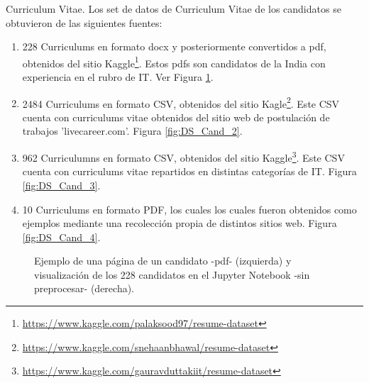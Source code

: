 \documentclass[12pt,a4paper]{article}
\makeatletter
\renewcommand\paragraph{\@startsection{paragraph}{4}{\z@}
            {-2.5ex\@plus -1ex \@minus -.25ex}
            {1.25ex \@plus .25ex}
            {\normalfont\normalsize\bfseries}}
\makeatother
\begin{document}
\begin{sloppypar}
\cleardoublepage

\paragraph{Curriculum Vitae.}\label{cvs}
Los set de datos de Curriculum Vitae de los candidatos se obtuvieron de las siguientes fuentes:

\begin{enumerate}
\item 228 Curriculums en formato docx y posteriormente convertidos a pdf, obtenidos del sitio Kaggle\footnote{\url{https://www.kaggle.com/palaksood97/resume-dataset}}. Estos pdfs son candidatos de la India con experiencia en el rubro de IT. Ver Figura \ref{fig:DS_Cand_1}.
\item 2484 Curriculums en formato CSV, obtenidos del sitio Kagle\footnote{\url{https://www.kaggle.com/snehaanbhawal/resume-dataset}}. Este CSV cuenta con curriculums vitae obtenidos del sitio web de postulación de trabajos 'livecareer.com'. Figura \ref{fig:DS_Cand_2}.
\item 962 Curriculumns en formato CSV, obtenidos del sitio Kaggle\footnote{\url{https://www.kaggle.com/gauravduttakiit/resume-dataset}}. Este CSV cuenta con curriculums vitae repartidos en distintas categorías de IT. Figura \ref{fig:DS_Cand_3}.
\item 10 Curriculums en formato PDF, los cuales los cuales fueron obtenidos como ejemplos mediante una recolección propia de distintos sitios web. Figura \ref{fig:DS_Cand_4}.
\end{enumerate}

\begin{figure}[H] 
 \centering
 \noindent{}
 \caption{Ejemplo de una página de un candidato -pdf- (izquierda) y visualización de los 228 candidatos en el Jupyter Notebook -sin preprocesar- (derecha).} 
 \label{fig:DS_Cand_1}
\end{figure}


\end{sloppypar}
\end{document}
